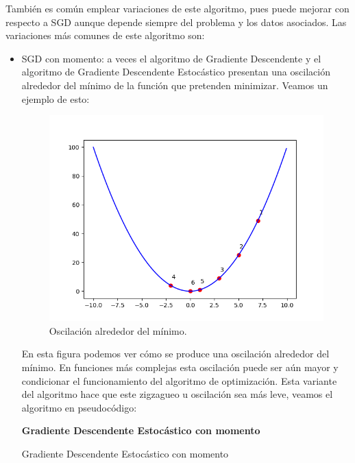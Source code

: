 También es común emplear variaciones de este algoritmo, pues puede mejorar con respecto a SGD aunque depende siempre del problema y los datos asociados. Las variaciones más comunes de este algoritmo son:

\begin{itemize}
	\item SGD con momento: a veces el algoritmo de Gradiente Descendente y el algoritmo de Gradiente Descendente Estocástico presentan una oscilación alrededor del mínimo de la función que pretenden minimizar. Veamos un ejemplo de esto:
	
	\begin{figure}[H]
		\centering
		\includegraphics[scale=0.7]{imagenes/sgd.png}
		\caption{Oscilación alrededor del mínimo.}
		\label{img:oscilacion-sgd}
	\end{figure}

	En esta figura podemos ver cómo se produce una oscilación alrededor del mínimo. En funciones más complejas esta oscilación puede ser aún mayor y condicionar el funcionamiento del algoritmo de optimización. Esta variante del algoritmo hace que este zigzagueo u oscilación sea más leve, veamos el algoritmo en pseudocódigo:
	
	\begin{algorithm}[H]{\Large{\textbf{Gradiente Descendente Estocástico con momento}}}
		
		\vspace{15px}
		
		\caption{Gradiente Descendente Estocástico con momento}
		\label{alg:sgd-momento}
		

\end{algorithm}
\end{itemize}
